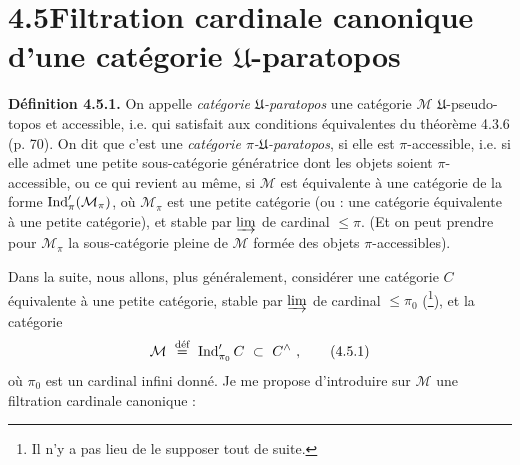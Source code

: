 \setcounter{footnote}{29}


\section*{4.5\quad Filtration cardinale canonique d'une catégorie $\mathfrak{U}$-paratopos}

\textbf{Définition 4.5.1.} On appelle \textit{catégorie $\mathfrak{U}$-paratopos} une catégorie $\mathcal{M}$ $\mathfrak{U}$-pseudo-topos et accessible, i.e. qui satisfait aux conditions équivalentes du théorème 4.3.6 (p. 70). On dit que c'est une \textit{catégorie $\pi$-$\mathfrak{U}$-paratopos}, si elle est $\pi$-accessible, i.e. si elle admet une petite sous-catégorie génératrice dont les objets soient $\pi$-accessible, ou ce qui revient au même, si %
$\mathcal{M}$ est équivalente à une catégorie de la forme $\operatorname{Ind}'_{\pi}(\mathcal{M}_{\pi})$, où $\mathcal{M}_{\pi}$ est une petite catégorie (ou : une catégorie équivalente à une petite catégorie), et stable par $\varinjlim$ de cardinal $\leqslant \pi$. (Et on peut prendre pour $\mathcal{M}_{\pi}$ la sous-catégorie pleine de $\mathcal{M}$ formée des objets
$\pi$-accessibles).

Dans la suite, nous allons, plus généralement, considérer une catégorie $C$ équivalente à une petite catégorie, stable par $\varinjlim$ de cardinal $\leqslant \pi_0$ (\footnote{Il n'y a pas lieu de le supposer tout de suite.}), et la catégorie
\[
\mathcal{M} \ \overset{\text{déf}}{=}\ \Ind'_{\pi_0}C \ \subset\ C^{\wedge}\ ,
\tag*{(4.5.1)}
\]
où $\pi_0$ est un cardinal infini donné. Je me propose d'introduire sur $\mathcal{M}$ une filtration cardinale canonique :

